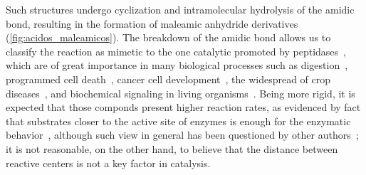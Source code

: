 %
Such structures undergo cyclization and intramolecular hydrolysis of the amidic
bond, resulting in the formation of maleamic anhydride derivatives (\cref{fig:acidos_maleamicos}).
The breakdown of the amidic bond allows us to classify the reaction as mimetic
to the one catalytic promoted by peptidases~\cite{Kirby_1972},
which are of great importance in many biological processes such as
digestion~\cite{Lehninger_2012}, programmed cell death~\cite{Fesik_2001},
cancer cell development~\cite{Kenny_1989},
the widespread of crop diseases~\cite{Kapust_2000},
and biochemical signaling in living
organisms~\cite{Lehninger_2012,Borissoff_2009}.
Being more rigid, it is expected that those componds present higher reaction
rates, as evidenced by fact that substrates closer to the active site of
enzymes is enough for the enzymatic behavior~\cite{Souza_2017},
although such view in general has been questioned by other authors~\cite{Nobel_2013};
it is not reasonable, on the other hand, to believe that the distance between
reactive centers is not a key factor in catalysis.

